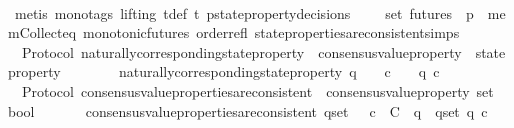\begin{isabellebody}
\ \ \ \ \isamarkupfalse%
\ {\isacharparenleft}metis\ {\isacharparenleft}mono{\isacharunderscore}tags{\isacharcomma}\ lifting{\isacharparenright}\ {\isasymSigma}t{\isacharunderscore}def\ {\isacartoucheopen}{\isasymexists}{\isasymsigma}{\isasymin}{\isasymSigma}t{\isachardot}\ {\isasymforall}p{\isasymin}{\isasymUnion}{\isacharbraceleft}state{\isacharunderscore}property{\isacharunderscore}decisions\ {\isasymsigma}\ {\isacharbar}{\isasymsigma}{\isachardot}\ {\isasymsigma}\ {\isasymin}\ {\isasymsigma}{\isacharunderscore}set{\isacharbraceright}{\isachardot}\ {\isasymforall}{\isasymsigma}{\isacharprime}{\isasymin}futures\ {\isasymsigma}{\isachardot}\ p\ {\isasymsigma}{\isacharprime}{\isacartoucheclose}\ mem{\isacharunderscore}Collect{\isacharunderscore}eq\ monotonic{\isacharunderscore}futures\ order{\isacharunderscore}refl\ state{\isacharunderscore}properties{\isacharunderscore}are{\isacharunderscore}consistent{\isachardot}simps{\isacharparenright}\isanewline
{}\isamarkupfalse%
%
\endisatagproof
{\isafoldproof}%
%
\isadelimproof
\isanewline
%
\endisadelimproof
\isanewline
\isanewline
\isanewline
\isanewline
{}\isamarkupfalse%
\ {\isacharparenleft}\ Protocol{\isacharparenright}\ naturally{\isacharunderscore}corresponding{\isacharunderscore}state{\isacharunderscore}property\ {\isacharcolon}{\isacharcolon}\ {\isachardoublequoteopen}consensus{\isacharunderscore}value{\isacharunderscore}property\ {\isasymRightarrow}\ state{\isacharunderscore}property{\isachardoublequoteclose}\isanewline
\ \ \ \isanewline
\ \ \ \ {\isachardoublequoteopen}naturally{\isacharunderscore}corresponding{\isacharunderscore}state{\isacharunderscore}property\ q\ {\isacharequal}\ {\isacharparenleft}{\isasymlambda}{\isasymsigma}{\isachardot}\ {\isasymforall}\ c\ {\isasymin}\ {\isasymepsilon}\ {\isasymsigma}{\isachardot}\ q\ c{\isacharparenright}{\isachardoublequoteclose}\isanewline
\isanewline
\isanewline
{}\isamarkupfalse%
\ {\isacharparenleft}\ Protocol{\isacharparenright}\ consensus{\isacharunderscore}value{\isacharunderscore}properties{\isacharunderscore}are{\isacharunderscore}consistent\ {\isacharcolon}{\isacharcolon}\ {\isachardoublequoteopen}consensus{\isacharunderscore}value{\isacharunderscore}property\ set\ {\isasymRightarrow}\ bool{\isachardoublequoteclose}\isanewline
\ \ \isanewline
\ \ \ \ {\isachardoublequoteopen}consensus{\isacharunderscore}value{\isacharunderscore}properties{\isacharunderscore}are{\isacharunderscore}consistent\ q{\isacharunderscore}set\ {\isacharequal}\ {\isacharparenleft}{\isasymexists}\ c\ {\isasymin}\ C{\isachardot}\ {\isasymforall}\ q\ {\isasymin}\ q{\isacharunderscore}set{\isachardot}\ q\ c{\isacharparenright}{\isachardoublequoteclose}\isanewline

\end{isabellebody}
